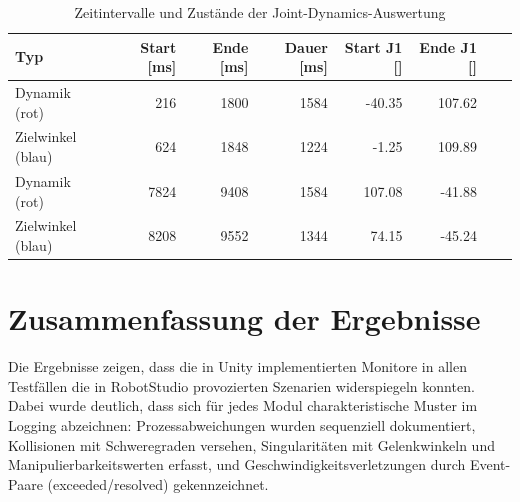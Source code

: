 \begin{table}[H]
	\centering
	\small
	\begin{tabularx}{\textwidth}{lrrrrrrX}
		\toprule
		Typ               & Start [ms] & Ende [ms] & Dauer [ms] & Start J1 [\textdegree] & Ende J1 [\textdegree] \\
		\midrule
		Dynamik (rot)     & 216        & 1800      & 1584       & -40.35       & 107.62      \\
		Zielwinkel (blau) & 624        & 1848      & 1224       & -1.25        & 109.89      \\
		Dynamik (rot)     & 7824       & 9408      & 1584       & 107.08       & -41.88      \\
		Zielwinkel (blau) & 8208       & 9552      & 1344       & 74.15        & -45.24      \\
		\bottomrule
	\end{tabularx}
	\caption{Zeitintervalle und Zustände der Joint-Dynamics-Auswertung}
	\label{tab:jointdynamics}
\end{table}

\section{Zusammenfassung der Ergebnisse}
Die Ergebnisse zeigen, dass die in Unity implementierten Monitore in allen Testfällen
die in RobotStudio provozierten Szenarien widerspiegeln konnten.
Dabei wurde deutlich, dass sich für jedes Modul charakteristische Muster
im Logging abzeichnen: Prozessabweichungen wurden sequenziell dokumentiert,
Kollisionen mit Schweregraden versehen, Singularitäten mit Gelenkwinkeln und
Manipulierbarkeitswerten erfasst, und Geschwindigkeitsverletzungen durch
Event-Paare (exceeded/resolved) gekennzeichnet.\\


